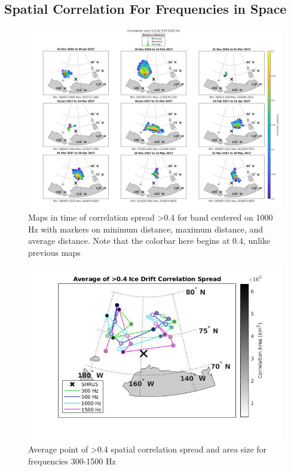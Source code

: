 
\subsection{Spatial Correlation For Frequencies in Space}  \label{sec_allfreq_map}
 
\begin{figure}[p]
\centering
\includegraphics[scale=0.24]{Figures/megamap_noisland_0.4_1000.jpg}
\caption{Maps in time of correlation spread >0.4 for band centered on 1000 Hz with markers on minimum distance, maximum distance, and average distance. Note that the colorbar here begins at 0.4, unlike previous maps}
\label{fig_megamap}
\end{figure}

\begin{figure}[p]
\centering
\includegraphics[scale=0.5]{Figures/avg_corr_summary.jpg}
\caption{Average point of >0.4 spatial correlation spread and area size for frequencies 300-1500 Hz}
\label{fig_avgmap}
\end{figure}

